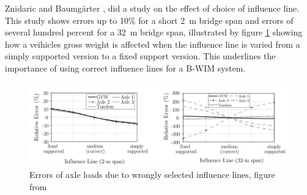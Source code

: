 Znidaric and Baumgärter \cite{bwim_an_overview}, did a study on the effect of choice of influence line. This study shows errors up to 10\% for a short \SI{2}{\metre} bridge span and errors of several hundred percent for a \SI{32}{\metre} bridge span, illustrated by figure \ref{fig:errorOfInfl} showing how a veihicles gross weight is affected when the influence line is varied from a simply supported version to a fixed support version. This underlines the importance of using correct influence lines for a B-WIM system.
\begin{figure}[h]
	\begin{adjustbox}{center}
		\includegraphics[width=1.2\textwidth]{figures/error_in_weights_dueTo_infl}
	\end{adjustbox}
\caption{Errors of axle loads due to wrongly selected influence lines, figure from \cite{Quilligan}}
\label{fig:errorOfInfl}
\end{figure}

